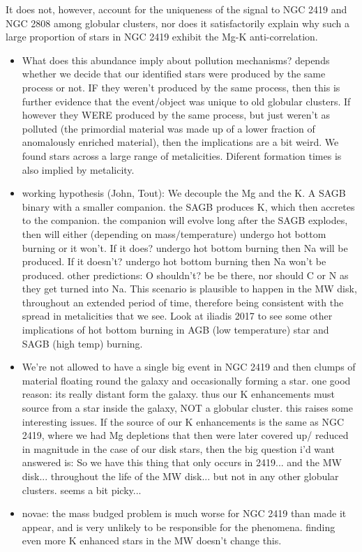 \documentclass[a4paper,fleqn,usenatbib]{mnras}
\begin{document}
It does not, however, account for the uniqueness of the signal to NGC 2419 and NGC 2808 among globular clusters, nor does it satisfactorily explain why such a large proportion of stars in NGC 2419 exhibit the Mg-K anti-correlation.

\begin{itemize}

\item What does this abundance imply about pollution mechanisms? depends whether we decide that our identified stars were produced by the same process or not. IF they weren't produced by the same process, then this is further evidence that the event/object was unique to old globular clusters. If however they WERE produced by the same process, but just weren't as polluted (the primordial material was made up of a lower fraction of anomalously enriched material), then the implications are a bit weird. We found stars across a large range of metalicities. Diferent formation times is also implied by metalicity.


\item working hypothesis (John, Tout): We decouple the Mg and the K. A SAGB binary with a smaller companion. the SAGB produces K, which then accretes to the companion. the companion will evolve long after the SAGB explodes, then will either (depending on mass/temperature) undergo hot bottom burning or it won't. If it does? undergo hot bottom burning then Na will be produced. If it doesn't? undergo hot bottom burning then Na won't be produced. other predictions: O shouldn't? be be there, nor should C or N as they get turned into Na. This scenario is plausible to happen in the MW disk, throughout an extended period of time, therefore being consistent with the spread in metalicities that we see. Look at iliadis 2017 to see some other implications of hot bottom burning in AGB (low temperature) star and SAGB (high temp) burning.

\item We're not allowed to have a single big event in NGC 2419 and then clumps of material floating round the galaxy and occasionally forming a star. one good reason: its really distant form the galaxy. thus our K enhancements must source from a star inside the galaxy, NOT a globular cluster. this raises some interesting issues. If the source of our K enhancements is the same as NGC 2419, where we had Mg depletions that then were later covered up/ reduced in magnitude in the case of our disk stars, then the big question i'd want answered is: So we have this thing that only occurs in 2419... and the MW disk... throughout the life of the MW disk... but not in any other globular clusters. seems a bit picky...

\item novae: the mass budged problem is much worse for NGC 2419 than \cite{iliadis2016} made it appear, and is very unlikely to be responsible for the phenomena. finding even more K enhanced stars in the MW doesn't change this.

\end{itemize}
\end{document}
